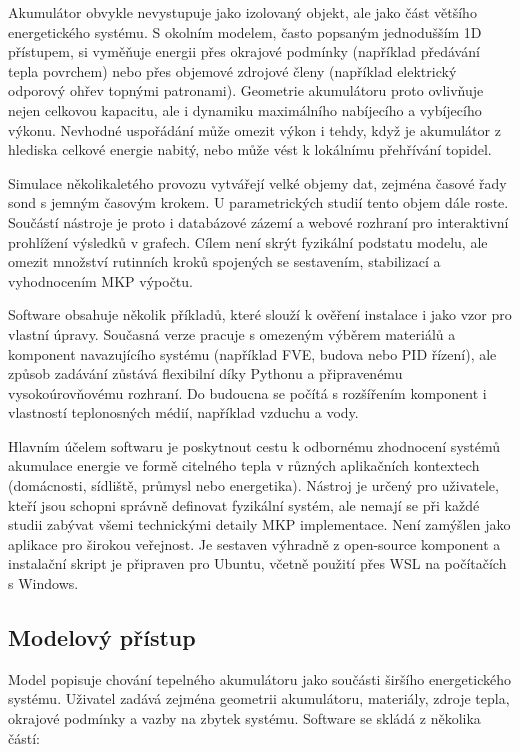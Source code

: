 \documentclass[a4paper,11pt]{article}
\begin{document}
Akumulátor obvykle nevystupuje jako izolovaný objekt, ale jako část většího
energetického systému. S okolním modelem, často popsaným jednodušším 1D
přístupem, si vyměňuje energii přes okrajové podmínky (například předávání
tepla povrchem) nebo přes objemové zdrojové členy (například elektrický odporový
ohřev topnými patronami). Geometrie akumulátoru proto ovlivňuje nejen celkovou
kapacitu, ale i dynamiku maximálního nabíjecího a vybíjecího výkonu. Nevhodné
uspořádání může omezit výkon i tehdy, když je akumulátor z hlediska celkové
energie nabitý, nebo může vést k lokálnímu přehřívání topidel.

Simulace několikaletého provozu vytvářejí velké objemy dat, zejména časové řady
sond s jemným časovým krokem. U parametrických studií tento objem dále roste.
Součástí nástroje je proto i databázové zázemí a webové rozhraní pro
interaktivní prohlížení výsledků v grafech. Cílem není skrýt fyzikální podstatu
modelu, ale omezit množství rutinních kroků spojených se sestavením, stabilizací
a vyhodnocením MKP výpočtu.

Software obsahuje několik příkladů, které slouží k ověření instalace i jako
vzor pro vlastní úpravy. Současná verze pracuje s omezeným výběrem materiálů a
komponent navazujícího systému (například FVE, budova nebo PID řízení), ale
způsob zadávání zůstává flexibilní díky Pythonu a připravenému vysokoúrovňovému
rozhraní. Do budoucna se počítá s rozšířením komponent i vlastností
teplonosných médií, například vzduchu a vody.

Hlavním účelem softwaru je poskytnout cestu k odbornému zhodnocení systémů
akumulace energie ve formě citelného tepla v různých aplikačních kontextech
(domácnosti, sídliště, průmysl nebo energetika). Nástroj je určený pro uživatele,
kteří jsou schopni správně definovat fyzikální systém, ale nemají se při každé
studii zabývat všemi technickými detaily MKP implementace. Není zamýšlen jako
aplikace pro širokou veřejnost. Je sestaven výhradně z open-source komponent a
instalační skript je připraven pro Ubuntu, včetně použití přes WSL na počítačích
s Windows.

\subsection*{Modelový přístup}

Model popisuje chování tepelného akumulátoru jako součásti širšího energetického
systému. Uživatel zadává zejména geometrii akumulátoru, materiály, zdroje tepla,
okrajové podmínky a vazby na zbytek systému. Software se skládá z několika
částí:
\end{document}
